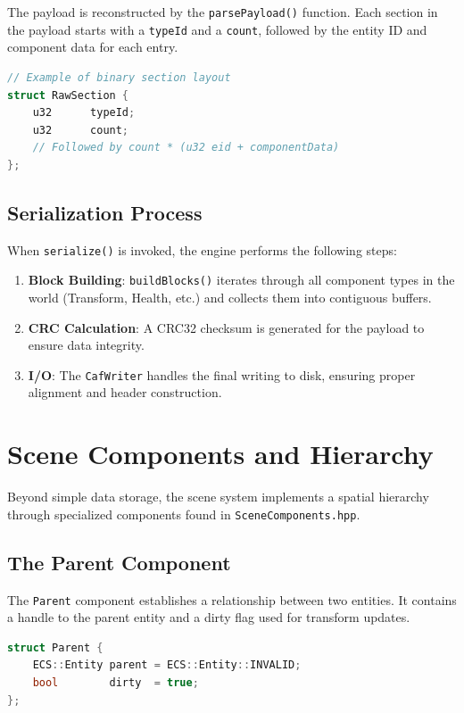 The payload is reconstructed by the \texttt{parsePayload()} function. Each section in the payload starts with a \texttt{typeId} and a \texttt{count}, followed by the entity ID and component data for each entry.

\begin{lstlisting}[language=C++]
// Example of binary section layout
struct RawSection {
    u32      typeId;
    u32      count;
    // Followed by count * (u32 eid + componentData)
};
\end{lstlisting}

\subsection{Serialization Process}

When \texttt{serialize()} is invoked, the engine performs the following steps:
\begin{enumerate}
    \item \textbf{Block Building}: \texttt{buildBlocks()} iterates through all component types in the world (Transform, Health, etc.) and collects them into contiguous buffers.
    \item \textbf{CRC Calculation}: A CRC32 checksum is generated for the payload to ensure data integrity.
    \item \textbf{I/O}: The \texttt{CafWriter} handles the final writing to disk, ensuring proper alignment and header construction.
\end{enumerate}

\section{Scene Components and Hierarchy}

Beyond simple data storage, the scene system implements a spatial hierarchy through specialized components found in \texttt{SceneComponents.hpp}.

\subsection{The Parent Component}

The \texttt{Parent} component establishes a relationship between two entities. It contains a handle to the parent entity and a dirty flag used for transform updates.

\begin{lstlisting}[language=C++]
struct Parent {
    ECS::Entity parent = ECS::Entity::INVALID;
    bool        dirty  = true;
};
\end{lstlisting}

